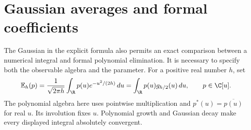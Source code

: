 \section{Gaussian averages and formal coefficients}
\label{sec:weil-gaussian-coefficients}

The Gaussian in the explicit formula also permits an exact comparison
between a numerical integral and formal polynomial elimination.
It is necessary to specify both the observable algebra and the parameter.
For a positive real number $h$, set
\[
 \mathbb E_h(p)=\frac1{\sqrt{2\pi h}}
       \int_{\R}p(u)e^{-u^2/(2h)}\,du
       =\int_{\R}p(u)g_{h/2}(u)\,du,
 \qquad p\in\C[u].
\]
The polynomial algebra here uses pointwise multiplication and
$p^*(u)=\overline{p(u)}$ for real $u$.
Its involution fixes $u$.  Polynomial growth and Gaussian decay make
every displayed integral absolutely convergent.

